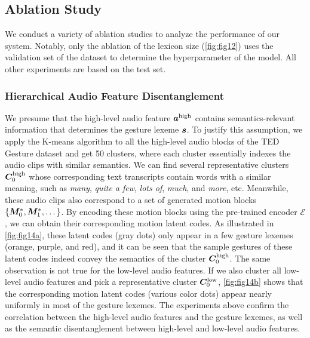 \subsection{Ablation Study}
\label{subsec:ablation_study}
We conduct a variety of ablation studies to analyze the performance of our system. Notably, only the ablation of the lexicon size (\fig\ref{fig:fig12}) uses the validation set of the dataset to determine the hyperparameter of the model. All other experiments are based on the test set.

\subsubsection{Hierarchical Audio Feature Disentanglement}
\label{subsubsec:disentanglement}
We presume that the high-level audio feature $\bm{a}^{{\text{high}}}$ contains semantics-relevant information that determines the gesture lexeme $\bm{s}$.
To justify this assumption, we apply the K-means algorithm to all the high-level audio blocks of the TED Gesture dataset and get 50 clusters, where each cluster essentially indexes the audio clips with similar semantics. We can find several representative clusters $\bm{C}^{{\text{high}}}_0$ whose corresponding text transcripts contain words with a similar meaning, such as \emph{many}, \emph{quite a few}, \emph{lots of}, \emph{much}, and \emph{more}, etc. Meanwhile, these audio clips also correspond to a set of generated motion blocks $\{\bm{M}^*_0,\bm{M}^*_1,\dots\}$. By encoding these motion blocks using the pre-trained encoder $\mathcal{E}$, we can obtain their corresponding motion latent codes. As illustrated in \fig\ref{fig:fig14a}, these latent codes (gray dots) only appear in a few gesture lexemes (orange, purple, and red), and it can be seen that the sample gestures of these latent codes indeed convey the semantics of the cluster $\bm{C}^{{\text{high}}}_0$.
The same observation is not true for the low-level audio features. If we also cluster all low-level audio features and pick a representative cluster $\bm{C}^{{\text{low}}}_0$, \fig\ref{fig:fig14b} shows that the corresponding motion latent codes (various color dots) appear nearly uniformly in most of the gesture lexemes.
The experiments above confirm the correlation between the high-level audio features and the gesture lexemes, as well as the semantic disentanglement between high-level and low-level audio features.

